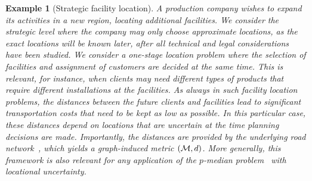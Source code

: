 \documentclass[12pt]{article}
\newtheorem{example}{Example}
\newcommand{\blue}[1]{{\color{black}#1}}
\begin{document}
\begin{example}[Strategic facility location]
\label{ex:UFL}
A production company wishes to expand its activities in a new region, locating additional facilities. We consider the strategic level where the company may only choose  approximate locations, as the exact locations will be known later, after all technical and legal considerations have been studied. \blue{We consider a one-stage location problem where the selection of facilities and assignment of customers are decided at the same time. This is relevant, for instance, when clients may need different types of products that require different installations at the facilities.} 
As always in such facility location problems, the distances between the future clients and facilities lead to significant transportation costs that need to be kept as low as possible. In this particular case, these distances depend on locations that are uncertain at the time planning decisions are made. %
Importantly, the distances are provided by the underlying road network~\citep{MELKOTE2001515}, which yields a graph-induced metric $(\mathcal{M},d)$. \blue{More generally, this framework is also relevant for any application of the $p$-median problem~\citep{Marin2019} with locational uncertainty.}%
\end{example}
\end{document}
